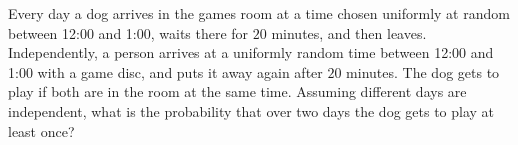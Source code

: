Every day a dog arrives in the games room at a time chosen uniformly at random between 12:00 and 1:00, waits there for $20$ minutes, and then leaves. Independently, a person arrives at a uniformly random time between 12:00 and 1:00 with a game disc, and puts it away again after $20$ minutes. The dog gets to play if both are in the room at the same time. Assuming different days are independent, what is the probability that over two days the dog gets to play at least once?
